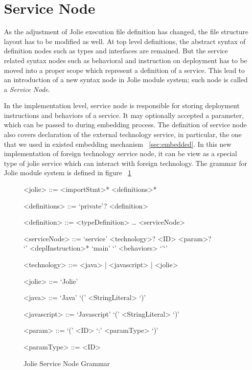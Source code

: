 \section{Service Node}

As the adjustment of Jolie execution file definition has changed, the file structure layout has to be modified as well.  At top level definitions, the abstract syntax of definition nodes such as types and interfaces are remained. But the service related syntax nodes such as behavioral and instruction on deployment has to be moved into a proper scope which represent a definition of a service. This lead to an introduction of a new syntax node in Jolie module system; such node is called a \textit{Service Node}.

In the implementation level, service node is responsible for storing deployment instructions and behaviors of a service. It may optionally accepted a parameter, which can be passed to during embedding process.
The definition of service node also covers declaration of the external technology service, in particular, the one that we used in existed embedding mechanism ~\ref{sec:embedded}.
In this new implementation of foreign technology service node, it can be view as a special type of jolie service which can interact with foreign technology.
The grammar for Jolie module system is defined in figure ~\ref{fig:jolie-servicenode-grammar}

\begin{figure}[h]
    \begin{framed}
        \begin{grammar}
            <jolie> ::= <importStmt>* <definitions>*

            <definitions> ::= `private'? <definition>

            <definition> ::=  <typeDefinition>
            \dots
            \alt <serviceNode>

            <serviceNode> ::= `service' <technology>? <ID> <param>? \\ `{' <deplInstruction>* `main' `{' <behaviors> `}'`}'

            <technology> ::= <java> | <javascript> | <jolie>

            <jolie> ::= `Jolie'

            <java> ::= `Java' `(' <StringLiteral> `)'

            <javascript> ::= `Javascript' `(' <StringLiteral> `)'

            <param> ::= `(' <ID> `:' <paramType> `)'

            <paramType> ::= <ID>
        \end{grammar}
    \end{framed}
    \caption{Jolie Service Node Grammar}
    \label{fig:jolie-servicenode-grammar}
\end{figure}

